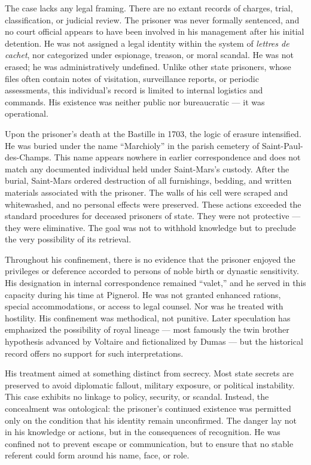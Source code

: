 The case lacks any legal framing. There are no extant records of charges, trial, classification, or judicial review. The prisoner was never formally sentenced, and no court official appears to have been involved in his management after his initial detention. He was not assigned a legal identity within the system of \textit{lettres de cachet}, nor categorized under espionage, treason, or moral scandal. He was not erased; he was administratively undefined. Unlike other state prisoners, whose files often contain notes of visitation, surveillance reports, or periodic assessments, this individual’s record is limited to internal logistics and commands. His existence was neither public nor bureaucratic — it was operational.

Upon the prisoner’s death at the Bastille in 1703, the logic of erasure intensified. He was buried under the name “Marchioly” in the parish cemetery of Saint-Paul-des-Champs. This name appears nowhere in earlier correspondence and does not match any documented individual held under Saint-Mars’s custody. After the burial, Saint-Mars ordered destruction of all furnishings, bedding, and written materials associated with the prisoner. The walls of his cell were scraped and whitewashed, and no personal effects were preserved. These actions exceeded the standard procedures for deceased prisoners of state. They were not protective — they were eliminative. The goal was not to withhold knowledge but to preclude the very possibility of its retrieval.

Throughout his confinement, there is no evidence that the prisoner enjoyed the privileges or deference accorded to persons of noble birth or dynastic sensitivity. His designation in internal correspondence remained “valet,” and he served in this capacity during his time at Pignerol. He was not granted enhanced rations, special accommodations, or access to legal counsel. Nor was he treated with hostility. His confinement was methodical, not punitive. Later speculation has emphasized the possibility of royal lineage — most famously the twin brother hypothesis advanced by Voltaire and fictionalized by Dumas — but the historical record offers no support for such interpretations.

His treatment aimed at something distinct from secrecy. Most state secrets are preserved to avoid diplomatic fallout, military exposure, or political instability. This case exhibits no linkage to policy, security, or scandal. Instead, the concealment was ontological: the prisoner’s continued existence was permitted only on the condition that his identity remain unconfirmed. The danger lay not in his knowledge or actions, but in the consequences of recognition. He was confined not to prevent escape or communication, but to ensure that no stable referent could form around his name, face, or role.

